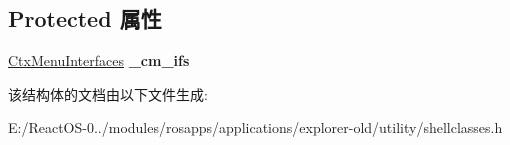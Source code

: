 \subsection*{Protected 属性}
\begin{DoxyCompactItemize}
\item 
\mbox{\label{struct_ext_context_menu_handler_t_a7afe77939c57514bc5d42941e65b60dc}} 
\hyperlink{struct_ctx_menu_interfaces}{Ctx\+Menu\+Interfaces} {\bfseries \+\_\+cm\+\_\+ifs}
\end{DoxyCompactItemize}


该结构体的文档由以下文件生成\+:\begin{DoxyCompactItemize}
\item 
E\+:/\+React\+O\+S-\/0../modules/rosapps/applications/explorer-\/old/utility/shellclasses.\+h\end{DoxyCompactItemize}
